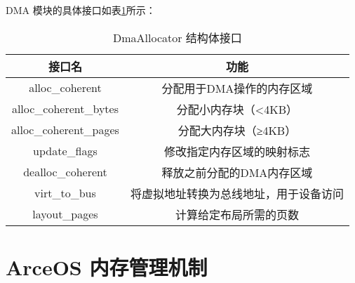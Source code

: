 DMA 模块的具体接口如表\ref{tab:DmaAllocator}所示：

\begin{table}
    \centering
    \caption{DmaAllocator 结构体接口}
    \begin{tabular}{cc}
        \toprule
        接口名 & 功能 \\ 
        \midrule
        alloc\_coherent & 分配用于DMA操作的内存区域 \\ 
        alloc\_coherent\_bytes & 分配小内存块（<4KB） \\ 
        alloc\_coherent\_pages & 分配大内存块（≥4KB） \\ 
        update\_flags & 修改指定内存区域的映射标志 \\ 
        dealloc\_coherent & 释放之前分配的DMA内存区域 \\ 
        virt\_to\_bus & 将虚拟地址转换为总线地址，用于设备访问 \\ 
        layout\_pages & 计算给定布局所需的页数 \\ 
        \bottomrule
    \end{tabular}
    \label{tab:DmaAllocator}
\end{table}

\section{ArceOS 内存管理机制}



